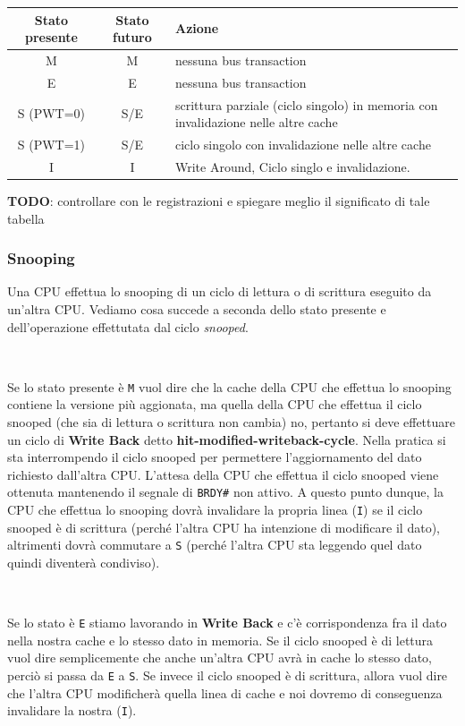 \documentclass[11pt]{book}
\begin{document}
\vspace{20pt}
\begin{center}
\begin{tabular}{c|c|p{5cm}}
  \textbf{Stato presente} & \textbf{Stato futuro} & \textbf{Azione} \\
  \hline
  M & M & nessuna bus transaction \\ \hline
  E & E & nessuna bus transaction \\ \hline
  S (PWT=0) & S/E & scrittura parziale (ciclo singolo) in memoria con invalidazione
  nelle altre cache \\ \hline
  S (PWT=1) & S/E & ciclo singolo con invalidazione nelle altre cache \\ \hline
  I & I & Write Around, Ciclo singlo e invalidazione.
\end{tabular}
\end{center}

\textbf{TODO}: controllare con le registrazioni e spiegare meglio il
significato di tale tabella

\subsubsection*{Snooping}

Una CPU effettua lo snooping di un ciclo di lettura o di scrittura
eseguito da un'altra CPU. Vediamo cosa succede a seconda dello stato
presente e dell'operazione effettutata dal ciclo \textit{snooped}.

\

Se lo stato presente \`e \texttt{M} vuol dire che la cache della CPU
che effettua lo snooping contiene la versione pi\`u aggionata, ma
quella della CPU che effettua il ciclo snooped (che sia di lettura o
scrittura non cambia) no, pertanto si deve effettuare un ciclo di
\textbf{Write Back} detto \textbf{hit-modified-writeback-cycle}. Nella
pratica si sta interrompendo il ciclo snooped per permettere
l'aggiornamento del dato richiesto dall'altra CPU. L'attesa della CPU
che effettua il ciclo snooped viene ottenuta mantenendo il segnale di
\texttt{BRDY\#} non attivo. A questo punto dunque, la CPU che effettua
lo snooping dovr\`a invalidare la propria linea (\texttt{I}) se il
ciclo snooped \`e di scrittura (perch\'e l'altra CPU ha intenzione di
modificare il dato), altrimenti dovr\`a commutare a \texttt{S}
(perch\'e l'altra CPU sta leggendo quel dato quindi diventer\`a
condiviso).

\

Se lo stato \`e \texttt{E} stiamo lavorando in \textbf{Write Back} e
c'\`e corrispondenza fra il dato nella nostra cache e lo stesso dato
in memoria. Se il ciclo snooped \`e di lettura vuol dire semplicemente
che anche un'altra CPU avr\`a in cache lo stesso dato, perci\`o si
passa da \texttt{E} a \texttt{S}. Se invece il ciclo snooped \`e di
scrittura, allora vuol dire che l'altra CPU modificher\`a quella linea
di cache e noi dovremo di conseguenza invalidare la nostra
(\texttt{I}).
\end{document}

